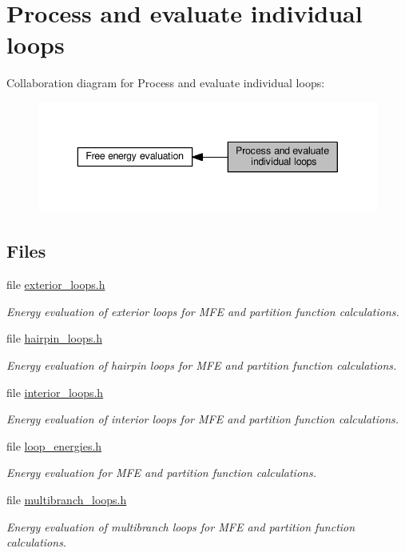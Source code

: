 \hypertarget{group__loops}{}\section{Process and evaluate individual loops}
\label{group__loops}
Collaboration diagram for Process and evaluate individual loops\+:
\nopagebreak
\begin{figure}[H]
\begin{center}
\leavevmode
\includegraphics[width=343pt]{group__loops}
\end{center}
\end{figure}
\subsection*{Files}
\begin{DoxyCompactItemize}
\item 
file \hyperlink{exterior__loops_8h}{exterior\+\_\+loops.\+h}
\begin{DoxyCompactList}\small\item\em Energy evaluation of exterior loops for M\+FE and partition function calculations. \end{DoxyCompactList}\item 
file \hyperlink{hairpin__loops_8h}{hairpin\+\_\+loops.\+h}
\begin{DoxyCompactList}\small\item\em Energy evaluation of hairpin loops for M\+FE and partition function calculations. \end{DoxyCompactList}\item 
file \hyperlink{interior__loops_8h}{interior\+\_\+loops.\+h}
\begin{DoxyCompactList}\small\item\em Energy evaluation of interior loops for M\+FE and partition function calculations. \end{DoxyCompactList}\item 
file \hyperlink{loop__energies_8h}{loop\+\_\+energies.\+h}
\begin{DoxyCompactList}\small\item\em Energy evaluation for M\+FE and partition function calculations. \end{DoxyCompactList}\item 
file \hyperlink{multibranch__loops_8h}{multibranch\+\_\+loops.\+h}
\begin{DoxyCompactList}\small\item\em Energy evaluation of multibranch loops for M\+FE and partition function calculations. \end{DoxyCompactList}\end{DoxyCompactItemize}
